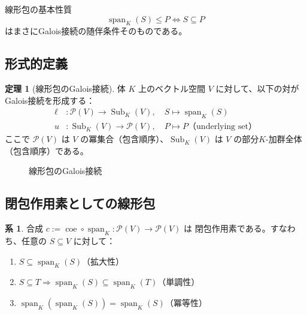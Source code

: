 \documentclass[a4paper,11pt]{ltjsarticle}
\theoremstyle{definition}
\newtheorem{theorem}[definition]{定理}
\newtheorem{corollary}[definition]{系}
\begin{document}
\begin{keyinsight}
  線形包の基本性質
  \[
    \operatorname{span}_K(S) \leq P \iff S \subseteq P
  \]
  はまさにGalois接続の随伴条件そのものである。
\end{keyinsight}

\subsection{形式的定義}

\begin{theorem}[線形包のGalois接続]
  体 $K$ 上のベクトル空間 $V$ に対して、以下の対がGalois接続を形成する：
  \begin{align*}
    \ell &: \mathcal{P}(V) \to \operatorname{Sub}_K(V), \quad S \mapsto \operatorname{span}_K(S) \\
    u &: \operatorname{Sub}_K(V) \to \mathcal{P}(V), \quad P \mapsto P \text{（underlying set）}
  \end{align*}
  ここで $\mathcal{P}(V)$ は $V$ の冪集合（包含順序）、$\operatorname{Sub}_K(V)$ は $V$ の部分$K$-加群全体（包含順序）である。
\end{theorem}

\begin{figure}[htbp]
  \centering
  \caption{線形包のGalois接続}
  \label{fig:span-gc}
\end{figure}

\subsection{閉包作用素としての線形包}

\begin{corollary}
  合成 $c := \operatorname{coe} \circ \operatorname{span}_K : \mathcal{P}(V) \to \mathcal{P}(V)$ は
  閉包作用素である。すなわち、任意の $S \subseteq V$ に対して：
  \begin{enumerate}
    \item $S \subseteq \operatorname{span}_K(S)$（拡大性）
    \item $S \subseteq T \Rightarrow \operatorname{span}_K(S) \subseteq \operatorname{span}_K(T)$（単調性）
    \item $\operatorname{span}_K(\operatorname{span}_K(S)) = \operatorname{span}_K(S)$（冪等性）
  \end{enumerate}
\end{corollary}
\end{document}
